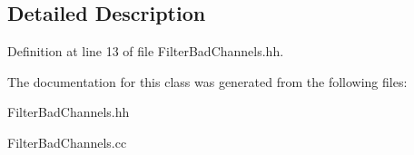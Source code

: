 \subsection{Detailed Description}


Definition at line 13 of file FilterBadChannels.hh.

The documentation for this class was generated from the following files:\begin{DoxyCompactItemize}
\item 
FilterBadChannels.hh\item 
FilterBadChannels.cc\end{DoxyCompactItemize}
